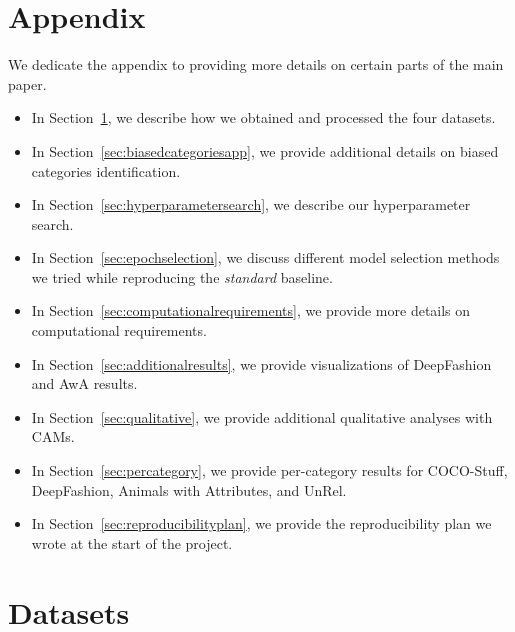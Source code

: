 \appendix
\renewcommand{\thesection}{\Alph{section}}
\setcounter{table}{0}
\renewcommand{\thetable}{A\arabic{table}} %
\setcounter{figure}{0}
\renewcommand{\thefigure}{A\arabic{figure}} %


\section*{Appendix}

We dedicate the appendix to providing more details on certain parts of the main paper.
\begin{itemize}[leftmargin=*,noitemsep]
    \item In Section~\ref{sec:datasets}, we describe how we obtained and processed the four datasets.
    \item In Section~\ref{sec:biasedcategoriesapp}, we provide additional details on biased categories identification.
    \item In Section~\ref{sec:hyperparametersearch}, we describe our hyperparameter search.
    \item In Section~\ref{sec:epochselection}, we discuss different model selection methods we tried while reproducing the \textit{standard} baseline.
    \item In Section~\ref{sec:computationalrequirements}, we provide more details on computational requirements.
    \item In Section~\ref{sec:additionalresults}, we provide visualizations of DeepFashion and AwA results.
    \item In Section~\ref{sec:qualitative}, we provide additional qualitative analyses with CAMs.
    \item In Section~\ref{sec:percategory}, we provide per-category results for COCO-Stuff, DeepFashion, Animals with Attributes, and UnRel.
    \item In Section~\ref{sec:reproducibilityplan}, we provide the reproducibility plan we wrote at the start of the project.
\end{itemize}

\section{Datasets} \label{sec:datasets}

